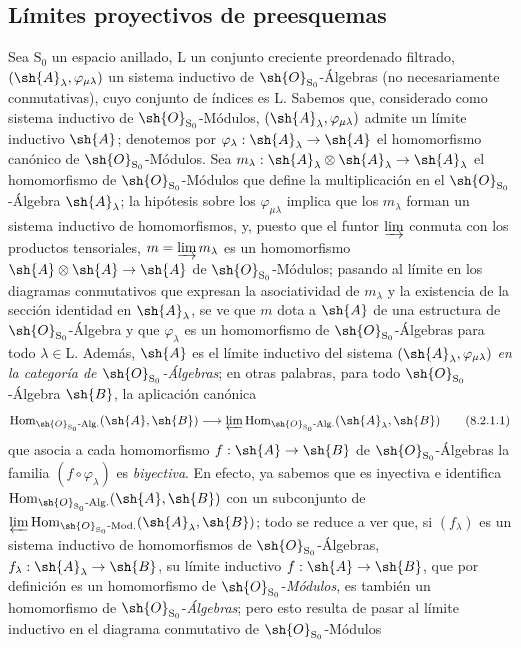 \subsection{Límites proyectivos de preesquemas}
\label{subsection:IV.8.2}

\begin{env}[8.2.1]
\label{IV.8.2.1}
Sea $\mathrm{S}_0$ un espacio anillado, $\mathrm{L}$ un conjunto creciente preordenado filtrado, $(\sh{A}_\lambda,\varphi_{\mu\lambda})$ un sistema inductivo de $\sh{O}_{\mathrm{S}_0}$-Álgebras (no necesariamente conmutativas), cuyo conjunto de índices es $\mathrm{L}$.
Sabemos que, considerado como sistema inductivo de $\sh{O}_{\mathrm{S}_0}$-Módulos, $(\sh{A}_\lambda,\varphi_{\mu\lambda})$ admite un límite inductivo $\sh{A}$; denotemos por $\varphi_\lambda:\sh{A}_\lambda\to\sh{A}$ el homomorfismo canónico de $\sh{O}_{\mathrm{S}_0}$-Módulos.
Sea $m_\lambda:\sh{A}_\lambda\otimes\sh{A}_\lambda\to\sh{A}_\lambda$ el homomorfismo de $\sh{O}_{\mathrm{S}_0}$-Módulos que define la multiplicación en el $\sh{O}_{\mathrm{S}_0}$-Álgebra $\sh{A}_\lambda$; la hipótesis sobre los $\varphi_{\mu\lambda}$ implica que los $m_\lambda$ forman un sistema inductivo de homomorfismos,
y, puesto que el funtor $\varinjlim$ conmuta con los productos tensoriales, $m=\varinjlim m_\lambda$ es un homomorfismo $\sh{A}\otimes\sh{A}\to\sh{A}$ de $\sh{O}_{\mathrm{S}_0}$-Módulos; pasando al límite en los diagramas conmutativos que expresan la asociatividad de $m_\lambda$ y la existencia de la sección identidad en $\sh{A}_\lambda$, se ve que $m$ dota a $\sh{A}$ de una estructura de $\sh{O}_{\mathrm{S}_0}$-Álgebra y que $\varphi_\lambda$ es un homomorfismo de $\sh{O}_{\mathrm{S}_0}$-Álgebras para todo $\lambda\in\mathrm{L}$.
Además, $\sh{A}$ es el límite inductivo del sistema $(\sh{A}_\lambda,\varphi_{\mu\lambda})$ \emph{en la categoría de $\sh{O}_{\mathrm{S}_0}$-Álgebras}; en otras palabras, para todo $\sh{O}_{\mathrm{S}_0}$-Álgebra $\sh{B}$, la aplicación canónica
\begin{equation}
  \operatorname{Hom}_{\sh{O}_{\mathrm{S}_0}\text{-}\mathrm{Alg.}}(\sh{A},\sh{B})\to\varprojlim\operatorname{Hom}_{\sh{O}_{\mathrm{S}_0}\text{-}\mathrm{Alg.}}(\sh{A}_\lambda,\sh{B})
  \tag{8.2.1.1}
\label{IV.8.2.1.1}
\end{equation}
que asocia a cada homomorfismo $f:\sh{A}\to\sh{B}$ de $\sh{O}_{\mathrm{S}_0}$-Álgebras la familia $(f\circ\varphi_\lambda)$ es \emph{biyectiva}.
En efecto, ya sabemos que es inyectiva e identifica $\operatorname{Hom}_{\sh{O}_{\mathrm{S}_0}\text{-}\mathrm{Alg.}}(\sh{A},\sh{B})$ con un subconjunto de $\varprojlim\operatorname{Hom}_{\sh{O}_{\mathrm{S}_0}\text{-}\mathrm{Mod.}}(\sh{A}_\lambda,\sh{B})$; todo se reduce a ver que, si $(f_\lambda)$ es un sistema inductivo de homomorfismos de $\sh{O}_{\mathrm{S}_0}$-Álgebras, $f_\lambda:\sh{A}_\lambda\to\sh{B}$, su límite inductivo $f:\sh{A}\to\sh{B}$, que por definición es un homomorfismo de $\sh{O}_{\mathrm{S}_0}$-\emph{Módulos}, es también un homomorfismo de $\sh{O}_{\mathrm{S}_0}$-\emph{Álgebras}; pero esto resulta de pasar al límite inductivo en el diagrama conmutativo de $\sh{O}_{\mathrm{S}_0}$-Módulos

\end{env}
